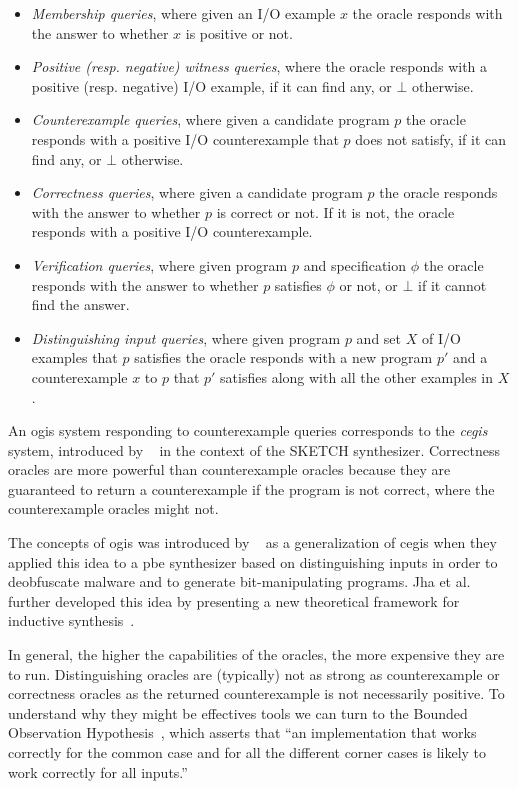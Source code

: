 \begin{itemize}
\item \textit{Membership queries}, where given an I/O example $x$ the oracle
  responds with the answer to whether $x$ is positive or not.
\item \textit{Positive (resp. negative) witness queries}, where the oracle
  responds with a positive (resp. negative) I/O example, if it can find any, or
  $\bot$ otherwise.
\item \textit{Counterexample queries}, where given a candidate program $p$ the
  oracle responds with a positive I/O counterexample that $p$ does not satisfy,
  if it can find any, or $\bot$ otherwise.
\item \textit{Correctness queries}, where given a candidate program $p$ the
  oracle responds with the answer to whether $p$ is correct or not. If it is not,
  the oracle responds with a positive I/O counterexample.
\item \textit{Verification queries}, where given program $p$ and specification
  $\phi$ the oracle responds with the answer to whether $p$ satisfies $\phi$ or
  not, or $\bot$ if it cannot find the answer.
\item \textit{Distinguishing input queries}, where given program $p$ and set $X$
  of I/O examples that $p$ satisfies the oracle responds with a new program $p'$
  and a counterexample $x$ to $p$ that $p'$ satisfies along with all the other
  examples in $X$.
\end{itemize}

An \gls{ogis} system responding to counterexample queries corresponds to the
\textit{\gls{cegis}} system, introduced by
\citeauthor{Solar-Lezama:2008}~\cite{Solar-Lezama:2008} in the context of the
SKETCH synthesizer. Correctness oracles are more powerful than counterexample
oracles because they are guaranteed to return a counterexample if the program is
not correct, where the counterexample oracles might not.

The concepts of \gls{ogis} was introduced by
\citeauthor{Jha:2017:TFS}~\cite{Jha:2017:TFS} as a generalization of \gls{cegis}
when they applied this idea to a \gls{pbe} synthesizer based on distinguishing
inputs in order to deobfuscate malware and to generate bit-manipulating
programs. Jha et al. further developed this idea by presenting a new theoretical
framework for inductive synthesis~\cite{Jha:2017:TFS}.

In general, the higher the capabilities of the oracles, the more expensive they
are to run. Distinguishing oracles are (typically) not as strong as
counterexample or correctness oracles as the returned counterexample is not
necessarily positive. To understand why they might be effectives tools we can
turn to the Bounded Observation Hypothesis~\cite{Solar-Lezama:2008}, which
asserts that ``an implementation that works correctly for the common case and
for all the different corner cases is likely to work correctly for all inputs.''


